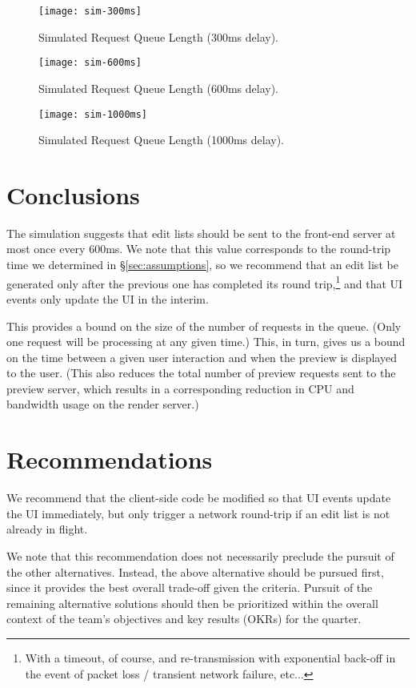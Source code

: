 \documentclass[se]{uw-wkrpt}
\begin{document}
\begin{figure}
  \centering
  \texttt{[image: sim-300ms]}
  \caption{Simulated Request Queue Length (300ms delay).}
  \label{fig:sim-300ms}
\end{figure}

\begin{figure}
  \centering
  \texttt{[image: sim-600ms]}
  \caption{Simulated Request Queue Length (600ms delay).}
  \label{fig:sim-600ms}
\end{figure}

\begin{figure}
  \centering
  \texttt{[image: sim-1000ms]}
  \caption{Simulated Request Queue Length (1000ms delay).}
  \label{fig:sim-1000ms}
\end{figure}

\section{Conclusions}
The simulation suggests that edit lists should be sent to the front-end
server at most once every 600ms. We note that this value corresponds to the
round-trip time we determined in \S\ref{sec:assumptions}, so we recommend
that an edit list be generated only after the previous one has completed
its round trip,\footnote{With a timeout, of course, and re-transmission
with exponential back-off in the event of packet loss / transient network
failure, etc...} and that UI events only update the UI in the interim.

This provides a bound on the size of the number of requests in the queue.
(Only one request will be processing at any given time.) This, in turn,
gives us a bound on the time between a given user interaction and when the
preview is displayed to the user. (This also reduces the total number of
preview requests sent to the preview server, which results in a
corresponding reduction in CPU and bandwidth usage on the render server.)

\section{Recommendations}
We recommend that the client-side code be modified so that UI events update
the UI immediately, but only trigger a network round-trip if an edit list
is not already in flight.

We note that this recommendation does not necessarily preclude the pursuit
of the other alternatives. Instead, the above alternative should be pursued
first, since it provides the best overall trade-off given the criteria.
Pursuit of the remaining alternative solutions should then be prioritized
within the overall context of the team's objectives and key results (OKRs)
for the quarter.
\end{document}
